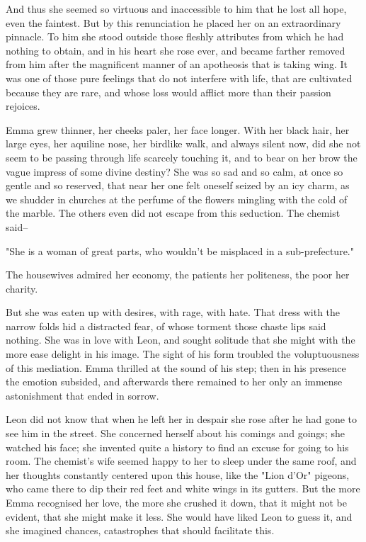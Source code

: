 \documentclass{tufte-book}
\begin{document}
And thus she seemed so virtuous and inaccessible to him that he lost all
hope, even the faintest. But by this renunciation he placed her on
an extraordinary pinnacle. To him she stood outside those fleshly
attributes from which he had nothing to obtain, and in his heart she
rose ever, and became farther removed from him after the magnificent
manner of an apotheosis that is taking wing. It was one of those pure
feelings that do not interfere with life, that are cultivated because
they are rare, and whose loss would afflict more than their passion
rejoices.

Emma grew thinner, her cheeks paler, her face longer. With her black
hair, her large eyes, her aquiline nose, her birdlike walk, and always
silent now, did she not seem to be passing through life scarcely
touching it, and to bear on her brow the vague impress of some divine
destiny? She was so sad and so calm, at once so gentle and so reserved,
that near her one felt oneself seized by an icy charm, as we shudder
in churches at the perfume of the flowers mingling with the cold of the
marble. The others even did not escape from this seduction. The chemist
said--

"She is a woman of great parts, who wouldn't be misplaced in a
sub-prefecture."

The housewives admired her economy, the patients her politeness, the
poor her charity.

But she was eaten up with desires, with rage, with hate. That dress with
the narrow folds hid a distracted fear, of whose torment those chaste
lips said nothing. She was in love with Leon, and sought solitude that
she might with the more ease delight in his image. The sight of his
form troubled the voluptuousness of this mediation. Emma thrilled at
the sound of his step; then in his presence the emotion subsided, and
afterwards there remained to her only an immense astonishment that ended
in sorrow.

Leon did not know that when he left her in despair she rose after he had
gone to see him in the street. She concerned herself about his comings
and goings; she watched his face; she invented quite a history to find
an excuse for going to his room. The chemist's wife seemed happy to her
to sleep under the same roof, and her thoughts constantly centered upon
this house, like the "Lion d'Or" pigeons, who came there to dip their
red feet and white wings in its gutters. But the more Emma recognised
her love, the more she crushed it down, that it might not be evident,
that she might make it less. She would have liked Leon to guess it, and
she imagined chances, catastrophes that should facilitate this.
\end{document}
